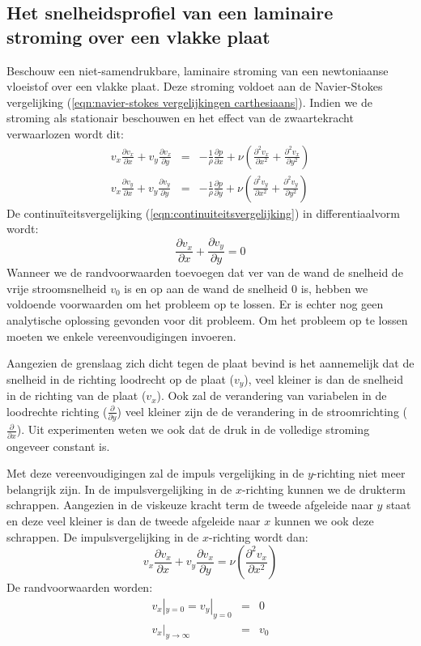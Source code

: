 		\subsection{Het snelheidsprofiel van een laminaire stroming over een vlakke plaat}
Beschouw een niet-samendrukbare, laminaire stroming van een newtoniaanse vloeistof over een vlakke plaat. Deze stroming voldoet aan de Navier-Stokes vergelijking (\ref{eqn:navier-stokes vergelijkingen carthesiaans}). Indien we de stroming als stationair beschouwen en het effect van de zwaartekracht verwaarlozen wordt dit:
\begin{eqnarray}
	v_x \frac{\partial v_x}{\partial x} + v_y \frac{\partial v_x}{\partial y} &=& -\frac{1}{\rho}\frac{\partial p}{\partial x} + \nu \left( \frac{\partial^2 v_x}{\partial x^2} + \frac{\partial^2 v_x}{\partial y^2} \right) \\
	v_x \frac{\partial v_y}{\partial x} + v_y \frac{\partial v_y}{\partial y} &=& -\frac{1}{\rho}\frac{\partial p}{\partial y} + \nu \left( \frac{\partial^2 v_y}{\partial x^2} + \frac{\partial^2 v_y}{\partial y^2} \right)
\end{eqnarray}
De continuïteitsvergelijking (\ref{eqn:continuiteitsvergelijking}) in differentiaalvorm wordt:
\begin{equation}
	\frac{\partial v_x}{\partial x} + \frac{\partial v_y}{\partial y} = 0
\end{equation}
Wanneer we de randvoorwaarden toevoegen dat ver van de wand de snelheid de vrije stroomsnelheid $v_0$ is en op aan de wand de snelheid 0 is, hebben we voldoende voorwaarden om het probleem op te lossen. Er is echter nog geen analytische oplossing gevonden voor dit probleem. Om het probleem op te lossen moeten we enkele vereenvoudigingen invoeren. 

Aangezien de grenslaag zich dicht tegen de plaat bevind is het aannemelijk dat de snelheid in de richting loodrecht op de plaat ($v_y$), veel kleiner is dan de snelheid in de richting van de plaat ($v_x$). Ook zal de verandering van variabelen in de loodrechte richting ($\frac{\partial}{\partial y}$) veel kleiner zijn de de verandering in de stroomrichting ($\frac{\partial}{\partial x}$). Uit experimenten weten we ook dat de druk in de volledige stroming ongeveer constant is. 

Met deze vereenvoudigingen zal de impuls vergelijking in de $y$-richting niet meer belangrijk zijn. In de impulsvergelijking in de $x$-richting kunnen we de drukterm schrappen. Aangezien in de viskeuze kracht term de tweede afgeleide naar $y$ staat en deze veel kleiner is dan de tweede afgeleide naar $x$ kunnen we ook deze schrappen. De impulsvergelijking in de $x$-richting wordt dan:
\begin{equation}
	v_x \frac{\partial v_x}{\partial x} + v_y \frac{\partial v_x}{\partial y} = \nu \left( \frac{\partial^2 v_x}{\partial x^2} \right)
\end{equation}
De randvoorwaarden worden:
\begin{eqnarray}
	v_x|_{y=0} = v_y|_{y=0} &=& 0 \\
	v_x|_{y\rightarrow\infty} &=& v_0
\end{eqnarray}


